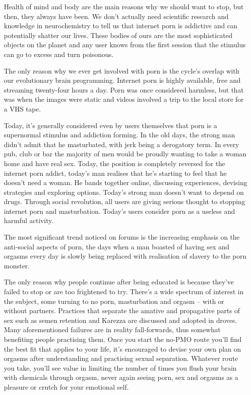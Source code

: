\documentclass[easypeasy.tex]{subfiles}
\begin{document}
Health of mind and body are the main reasons why we should want to stop, but then, they always have been. We don't actually need scientific research and knowledge in neurochemistry to tell us that internet porn is addictive and can potentially shatter our lives. These bodies of ours are the most sophisticated objects on the planet and any user knows from the first session that the stimulus can go to excess and turn poisonous.

The only reason why we ever get involved with porn is the cycle's overlap with our evolutionary brain programming. Internet porn is highly available, free and streaming twenty-four hours a day. Porn was once considered harmless, but that was when the images were static and videos involved a trip to the local store for a VHS tape.

Today, it's generally considered even by users themselves that porn is a supernormal stimulus and addiction forming. In the old days, the strong man didn't admit that he masturbated, with jerk being a derogatory term. In every pub, club or bar the majority of men would be proudly wanting to take a woman home and have real sex. Today, the position is completely reversed for the internet porn addict, today's man realises that he's starting to feel that he doesn't need a woman. He bands together online, discussing experiences, devising strategies and exploring options. Today's strong man doesn't want to depend on drugs. Through social revolution, all users are giving serious thought to stopping internet porn and masturbation. Today's users consider porn as a useless and harmful activity.

The most significant trend noticed on forums is the increasing emphasis on the anti-social aspects of porn, the days when a man boasted of having sex and orgasms every day is slowly being replaced with realisation of slavery to the porn monster.

The only reason why people continue after being educated is because they've failed to stop or are too frightened to try. There's a wide spectrum of interest in the subject, some turning to no porn, masturbation and orgasm -- with or without partners. Practices that separate the amative and propagative parts of sex such as semen retention and Karezza are discussed and adopted in droves. Many aforementioned failures are in reality fall-forwards, thus somewhat benefiting people practising them. Once you start the no-PMO route you'll find the best fit that applies to your life, it's encouraged to devise your own plan on orgasms after understanding and practising sexual separation. Whatever route you take, you'll see value in limiting the number of times you flush your brain with chemicals through orgasm, never again seeing porn, sex and orgasms as a pleasure or crutch for your emotional self.
\end{document}
